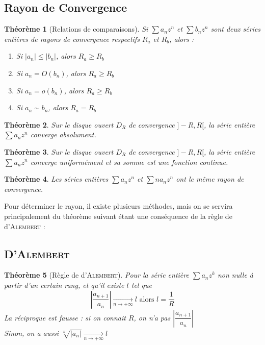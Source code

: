 \documentclass[11pt,a4paper]{report}
\newtheorem{theorem}{Théorème}[chapter]
\newtheorem{itheorem}[theorem]{Théorème}
\theoremstyle{definition}
\begin{document}
\subsection{Rayon de Convergence}
\begin{itheorem}[Relations de comparaisons]
     Si $\sum a_n z^n$ et $\sum b_n z^n$ sont deux séries entières de rayons de convergence respectifs $R_a$ et $R_b$, alors : 
     \renewcommand{\theenumi}{\roman{enumi}}
     \begin{enumerate}
         \item Si $|a_n| \le |b_n|$, alors $R_a \ge R_b$
         \item Si $a_n = O(b_n)$, alors $R_a \ge R_b$
         \item Si $a_n = o(b_n)$, alors $R_a \ge R_b$
         \item Si $a_n \sim b_n$, alors $R_a = R_b$
     \end{enumerate}
\end{itheorem}
\begin{theorem}
Sur le disque ouvert $D_R$ de convergence $]-R,R[$, la série entière $\sum a_n z^n$ converge \emph{absolument}.
\end{theorem}
\begin{theorem}
Sur le disque ouvert $D_R$ de convergence $]-R,R[$, la série entière $\sum a_n z^n$ converge \emph{uniformément} et sa somme est une fonction \emph{continue}.
\end{theorem}
\begin{theorem}
     Les séries entières $\sum a_n z^n$ et $\sum na_n z^n$ ont le même rayon de convergence.
\end{theorem}
Pour déterminer le rayon, il existe plusieurs méthodes, mais on se servira principalement du théorème suivant étant une conséquence de la règle de d'\textsc{Alembert} :\\

\subsection{D'\textsc{Alembert}}
\begin{itheorem}[Règle de d'\textsc{Alembert}]
Pour la série entière $\sum a_n z^{k}$ \emph{non nulle à partir d'un certain rang}, et qu'il existe $l$ tel que 
\[
\boxed{\left|\dfrac{a_{n+1}}{a_n}\right|\xrightarrow[n\to +\infty]{}l} \text{ alors } l = \frac{1}{R}
\]
La réciproque est fausse : si on connait $R$, on n'a pas $\left|\dfrac{a_{n+1}}{a_n}\right|$\\
Sinon, on a aussi $\sqrt[n]{|a_n|}\xrightarrow[n\to +\infty]{}l$
\end{itheorem}
\end{document}
